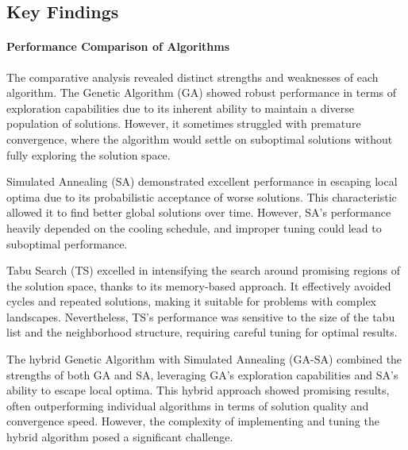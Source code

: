 \documentclass{article}
\begin{document}
    \subsection{Key Findings}

    \paragraph{Performance Comparison of Algorithms}
    The comparative analysis revealed distinct strengths and weaknesses of each algorithm. The Genetic Algorithm (GA) showed robust performance in terms of exploration capabilities due to its inherent ability to maintain a diverse population of solutions. However, it sometimes struggled with premature convergence, where the algorithm would settle on suboptimal solutions without fully exploring the solution space.

    Simulated Annealing (SA) demonstrated excellent performance in escaping local optima due to its probabilistic acceptance of worse solutions. This characteristic allowed it to find better global solutions over time. However, SA's performance heavily depended on the cooling schedule, and improper tuning could lead to suboptimal performance.

    Tabu Search (TS) excelled in intensifying the search around promising regions of the solution space, thanks to its memory-based approach. It effectively avoided cycles and repeated solutions, making it suitable for problems with complex landscapes. Nevertheless, TS's performance was sensitive to the size of the tabu list and the neighborhood structure, requiring careful tuning for optimal results.

    The hybrid Genetic Algorithm with Simulated Annealing (GA-SA) combined the strengths of both GA and SA, leveraging GA's exploration capabilities and SA's ability to escape local optima. This hybrid approach showed promising results, often outperforming individual algorithms in terms of solution quality and convergence speed. However, the complexity of implementing and tuning the hybrid algorithm posed a significant challenge.
\end{document}

